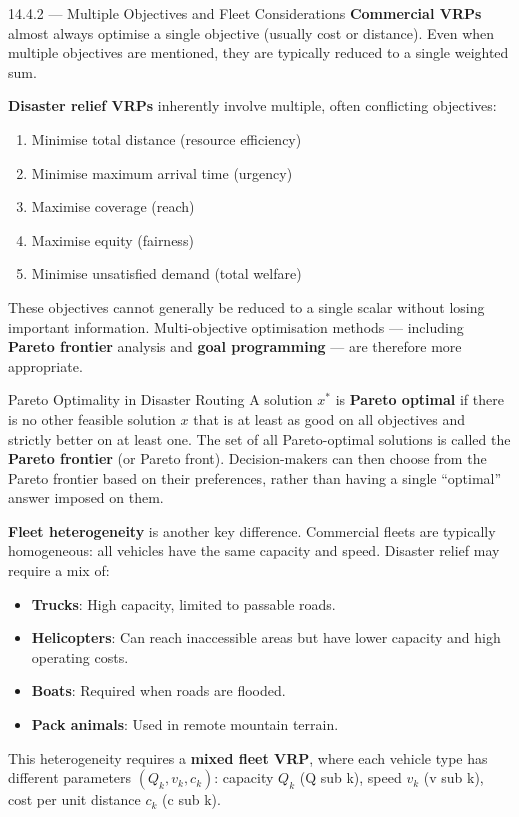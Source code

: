 \documentclass[aspectratio=169,10pt]{beamer}
\begin{document}
\begin{frame}[allowframebreaks]{14.4.2 --- Multiple Objectives and Fleet Considerations}
  \textbf{Commercial VRPs} almost always optimise a single objective
  (usually cost or distance).
  Even when multiple objectives are mentioned, they are typically
  reduced to a single weighted sum.

  \medskip
  \textbf{Disaster relief VRPs} inherently involve multiple, often
  conflicting objectives:
  \begin{enumerate}
    \item Minimise total distance (resource efficiency)
    \item Minimise maximum arrival time (urgency)
    \item Maximise coverage (reach)
    \item Maximise equity (fairness)
    \item Minimise unsatisfied demand (total welfare)
  \end{enumerate}
  These objectives cannot generally be reduced to a single scalar
  without losing important information.
  Multi-objective optimisation methods --- including
  \textbf{Pareto frontier} analysis and \textbf{goal programming} ---
  are therefore more appropriate.

  \medskip
  \begin{block}{Pareto Optimality in Disaster Routing}
    A solution $x^*$ is \textbf{Pareto optimal} if there is no other
    feasible solution $x$ that is at least as good on all objectives
    and strictly better on at least one.
    The set of all Pareto-optimal solutions is called the
    \textbf{Pareto frontier} (or Pareto front).
    Decision-makers can then choose from the Pareto frontier based on
    their preferences, rather than having a single ``optimal'' answer
    imposed on them.
  \end{block}

  \framebreak

  \textbf{Fleet heterogeneity} is another key difference.
  Commercial fleets are typically homogeneous: all vehicles have the
  same capacity and speed.
  Disaster relief may require a mix of:
  \begin{itemize}
    \item \textbf{Trucks}: High capacity, limited to passable roads.
    \item \textbf{Helicopters}: Can reach inaccessible areas but
          have lower capacity and high operating costs.
    \item \textbf{Boats}: Required when roads are flooded.
    \item \textbf{Pack animals}: Used in remote mountain terrain.
  \end{itemize}
  This heterogeneity requires a \textbf{mixed fleet VRP}, where
  each vehicle type has different parameters $(Q_k, v_k, c_k)$:
  capacity $Q_k$ (Q sub k), speed $v_k$ (v sub k), cost per unit
  distance $c_k$ (c sub k).


\end{frame}
\end{document}
